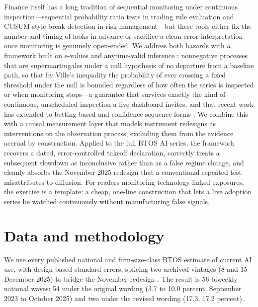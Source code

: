 \documentclass[preprint,12pt]{elsarticle}
\begin{document}
Finance itself has a long tradition of sequential monitoring under continuous inspection---sequential probability ratio tests in trading rule evaluation and CUSUM-style break detection in risk management---but these tools either fix the number and timing of looks in advance or sacrifice a clean error interpretation once monitoring is genuinely open-ended. We address both hazards with a framework built on e-values and anytime-valid inference \citep{shafer2019,vovk2021,ramdas2023}: nonnegative processes that are supermartingales under a null hypothesis of no departure from a baseline path, so that by Ville's inequality the probability of ever crossing a fixed threshold under the null is bounded regardless of how often the series is inspected or when monitoring stops---a guarantee that survives exactly the kind of continuous, unscheduled inspection a live dashboard invites, and that recent work has extended to betting-based and confidence-sequence forms \citep{howard2021,waudbysmith2024}. We combine this with a causal measurement layer that models instrument redesigns as interventions on the observation process, excluding them from the evidence accrual by construction. Applied to the full BTOS AI series, the framework recovers a dated, error-controlled takeoff declaration, correctly treats a subsequent slowdown as inconclusive rather than as a false regime change, and cleanly absorbs the November 2025 redesign that a conventional repeated test misattributes to diffusion. For readers monitoring technology-linked exposures, the exercise is a template: a cheap, one-line construction that lets a live adoption series be watched continuously without manufacturing false signals.

\section{Data and methodology}

We use every published national and firm-size-class BTOS estimate of current AI use, with design-based standard errors, splicing two archived vintages (8 and 15 December 2025) to bridge the November redesign \citep{goldschlag2025}. The result is 56 biweekly national waves: 54 under the original wording (3.7 to 10.0 percent, September 2023 to October 2025) and two under the revised wording (17.3, 17.2 percent).
\end{document}
